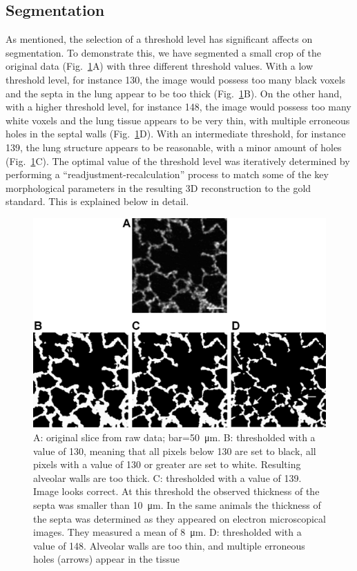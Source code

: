 \subsection{Segmentation}
As mentioned, the selection of a threshold level has significant affects on segmentation. To demonstrate this, we have segmented a small crop of the original data (Fig.~\ref{fig:segmentation}A) with three different threshold values. With a low threshold level, for instance 130, the image would possess too many black voxels and the septa in the lung appear to be too thick (Fig.~\ref{fig:segmentation}B). On the other hand, with a higher threshold level, for instance 148, the image would possess too many white voxels and the lung tissue appears to be very thin, with multiple erroneous holes in the septal walls (Fig.~\ref{fig:segmentation}D). With an intermediate threshold, for instance 139, the lung structure appears to be reasonable, with a minor amount of holes (Fig.~\ref{fig:segmentation}C). The optimal value of the threshold level was iteratively determined by performing a ``readjustment-recalculation'' process to match some of the key morphological parameters in the resulting 3D reconstruction to the gold standard. This is explained below in detail.

\begin{figure}[htb]
	\centering
	\includegraphics[width=\imsize]{img/Tsuda2008/Tsuda-06}
	\caption[Thresholding Influence]{A: original slice from raw data; bar=\SI{50}{\micro\meter}. B: thresholded with a value of 130, meaning that all pixels below 130 are set to black, all pixels with a value of 130 or greater are set to white. Resulting alveolar walls are too thick. C: thresholded with a value of 139. Image looks correct. At this
threshold the observed thickness of the septa was smaller than \SI{10}{\micro\meter}. In the same animals \cite{Roth2005} the thickness of the septa was determined as they appeared on electron microscopical images. They measured a mean of \SI{8}{\micro\meter}. D: thresholded with a value of 148. Alveolar walls are too thin, and multiple erroneous holes (arrows) appear in the tissue}
	\label{fig:segmentation}
\end{figure}

